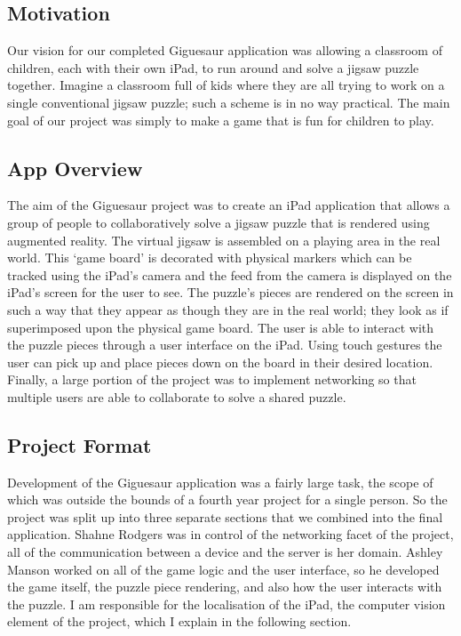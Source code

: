 \documentclass{article}
\begin{document}
\subsection{Motivation}

Our vision for our completed Giguesaur application was allowing a classroom of children, each with their own iPad, to run around and solve a jigsaw puzzle together. Imagine a classroom full of kids where they are all trying to work on a single conventional jigsaw puzzle; such a scheme is in no way practical. The main goal of our project was simply to make a game that is fun for children to play. 

\subsection{App Overview}

The aim of the Giguesaur project was to create an iPad application that allows a group of people to collaboratively solve a jigsaw puzzle that is rendered using augmented reality. The virtual jigsaw is assembled on a playing area in the real world. This `game board' is decorated with physical markers which can be tracked using the iPad's camera and the feed from the camera is displayed on the iPad's screen for the user to see. The puzzle's pieces are rendered on the screen in such a way that they appear as though they are in the real world; they look as if superimposed upon the physical game board. The user is able to interact with the puzzle pieces through a user interface on the iPad. Using touch gestures the user can pick up and place pieces down on the board in their desired location. Finally, a large portion of the project was to implement networking so that multiple users are able to collaborate to solve a shared puzzle. %

\subsection{Project Format}

Development of the Giguesaur application was a fairly large task, the scope of which was outside the bounds of a fourth year project for a single person. So the project was split up into three separate sections that we combined into the final application. Shahne Rodgers was in control of the networking facet of the project, all of the communication between a device and the server is her domain. Ashley Manson worked on all of the game logic and the user interface, so he developed the game itself, the puzzle piece rendering, and also how the user interacts with the puzzle. I am responsible for the localisation of the iPad, the computer vision element of the project, which I explain in the following section. 
\end{document}
